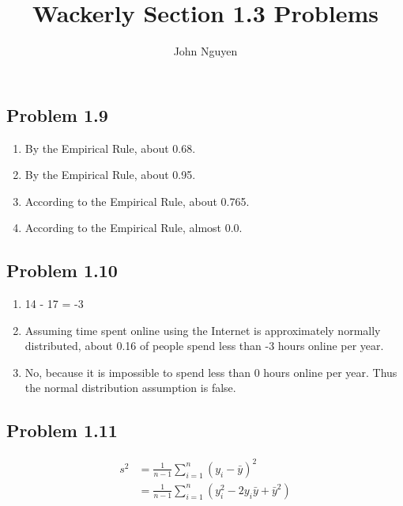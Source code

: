 \documentclass[12pt]{article}
\title{Wackerly Section 1.3 Problems}
\author{John Nguyen}
\begin{document}
\maketitle

\subsection*{Problem 1.9}
    \begin{enumerate}[label=(\alph*).]
        \item By the Empirical Rule, about 0.68.
        
        \item By the Empirical Rule, about 0.95.
        
        \item According to the Empirical Rule, about 0.765.
        
        \item According to the Empirical Rule, almost 0.0.
        
    \end{enumerate}

\subsection*{Problem 1.10}
    \begin{enumerate}[label=(\alph*).]
        \item 14 - 17 = -3
        
        \item Assuming time spent online using the Internet is approximately normally distributed, about 0.16 of people spend less than -3 hours online per year.
        
        \item No, because it is impossible to spend less than 0 hours online per year. Thus the normal distribution assumption is false.
        
    \end{enumerate}
    
\subsection*{Problem 1.11}
    \begin{align*}
        s^2 &= \frac{1}{n-1} \sum_{i = 1}^n (y_i - \bar{y})^2 \\
        &= \frac{1}{n-1} \sum_{i = 1}^n (y_i^2 - 2y_i \bar{y} + \bar{y}^2) \\
    \end{align*}
    
\end{document}
